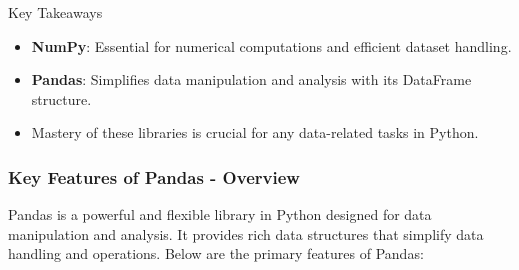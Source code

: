 \documentclass[aspectratio=169]{beamer}
\begin{document}
\begin{frame}{Key Takeaways}
    \begin{itemize}
        \item \textbf{NumPy}: Essential for numerical computations and efficient dataset handling.
        \item \textbf{Pandas}: Simplifies data manipulation and analysis with its DataFrame structure.
        \item Mastery of these libraries is crucial for any data-related tasks in Python.
    \end{itemize}
\end{frame}

\begin{frame}[fragile]
    \frametitle{Key Features of Pandas - Overview}
    Pandas is a powerful and flexible library in Python designed for data manipulation and analysis. 
    It provides rich data structures that simplify data handling and operations. Below are the primary features of Pandas:
\end{frame}
\end{document}
